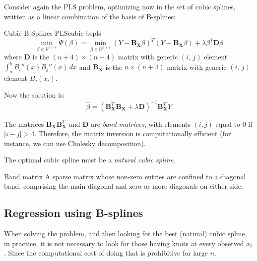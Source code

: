 Consider again the PLS problem, optimizing now in the set of cubic splines, written
as a linear combination of the basis of B-splines:
\begin{problem}{Cubic B-Splines PLS}{cubic-bspls}
    \begin{equation*}
        \min_{\beta \in \mathds R^{n+4}} \Psi(\beta) = \min_{\beta \in \mathds R^{n+4}}
        \left( Y - \boldsymbol B_{\boldsymbol X} \beta \right)^T
        \left( Y - \boldsymbol B_{\boldsymbol X} \beta \right)
        + \lambda \beta^T \boldsymbol D \beta
    \end{equation*}
    where $\boldsymbol D$ is the $(n+4)\times(n+4)$ matrix with generic $(i,\,j)$
    element $\int_a^b B_i''(x)B_j''(x)\,dx$ and $\boldsymbol B_{\boldsymbol X}$ is
    the $n \times (n+4)$ matrix with generic $(i,\,j)$ element $B_j(x_i)$.

    Now the solution is:
    \begin{equation*}
        \hat \beta = \left( \boldsymbol B_{\boldsymbol X}^T \boldsymbol B_{\boldsymbol X}
            + \lambda \boldsymbol D \right)^{-1} \boldsymbol B_{\boldsymbol X}^T Y
    \end{equation*}
    \tcblower
    \begin{note}
        The matrices $\boldsymbol B_{\boldsymbol X}\boldsymbol B_{\boldsymbol X}^T$ and
        $\boldsymbol D$ are \emph{band matrices}, with elements $(i,j)$ equal to 0 if
        $|i-j| > 4$. Therefore, the matrix inversion is computationally efficient
        (for instance, we can use Cholesky decomposition).
    \end{note}
    \begin{note}
        The optimal cubic spline must be a \emph{natural cubic spline}.
    \end{note}
\end{problem}

\begin{definition*}{Band matrix}{}
    A sparse matrix whose non-zero entries are confined to a diagonal band,
    comprising the main diagonal and zero or more diagonals on either side.
\end{definition*}

\subsection{Regression using B-splines}

When solving the  problem, and then looking for
the best (natural) cubic spline, in practice, it is not necessary to look
for those having knots at every observed $x_i$. Since the computational
cost of doing that is prohibitive for large $n$.

